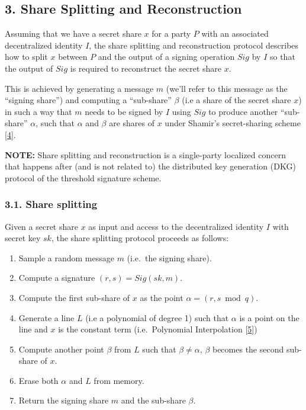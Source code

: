 \documentclass[
]{article}
\providecommand{\tightlist}{%
  \setlength{\itemsep}{0pt}\setlength{\parskip}{0pt}}
\begin{document}
\hypertarget{share-splitting-and-reconstruction}{%
\subsection{3. Share Splitting and
Reconstruction}\label{share-splitting-and-reconstruction}}

Assuming that we have a secret share \(x\) for a party \(P\) with an
associated decentralized identity \(I\), the share splitting and
reconstruction protocol describes how to split \(x\) between \(P\) and
the output of a signing operation \(Sig\) by \(I\) so that the output of
\(Sig\) is required to reconstruct the secret share \(x\).

This is achieved by generating a message \(m\) (we'll refer to this
message as the ``signing share'') and computing a ``sub-share''
\(\beta\) (i.e a share of the secret share \(x\)) in such a way that
\(m\) needs to be signed by \(I\) using \(Sig\) to produce another
``sub-share'' \(\alpha\), such that \(\alpha\) and \(\beta\) are shares
of \(x\) under Shamir's secret-sharing scheme
{[}\protect\hyperlink{ref-sss79}{4}{]}.

\textbf{NOTE:} Share splitting and reconstruction is a single-party
localized concern that happens after (and is not related to) the
distributed key generation (DKG) protocol of the threshold signature
scheme.

\hypertarget{share-splitting}{%
\subsubsection{3.1. Share splitting}\label{share-splitting}}

Given a secret share \(x\) as input and access to the decentralized
identity \(I\) with secret key \(sk\), the share splitting protocol
proceeds as follows:

\begin{enumerate}
\def\labelenumi{\arabic{enumi}.}
\tightlist
\item
  Sample a random message \(m\) (i.e.~the signing share).
\item
  Compute a signature \((r, s) = Sig(sk, m)\).
\item
  Compute the first sub-share of \(x\) as the point
  \(\alpha = (r, s \bmod q)\).
\item
  Generate a line \(L\) (i.e a polynomial of degree 1) such that
  \(\alpha\) is a point on the line and \(x\) is the constant term
  (i.e.~Polynomial Interpolation
  {[}\protect\hyperlink{ref-wiki:interpolation}{5}{]})
\item
  Compute another point \(\beta\) from \(L\) such that
  \(\beta \neq \alpha\), \(\beta\) becomes the second sub-share of
  \(x\).
\item
  Erase both \(\alpha\) and \(L\) from memory.
\item
  Return the signing share \(m\) and the sub-share \(\beta\).
\end{enumerate}
\end{document}
